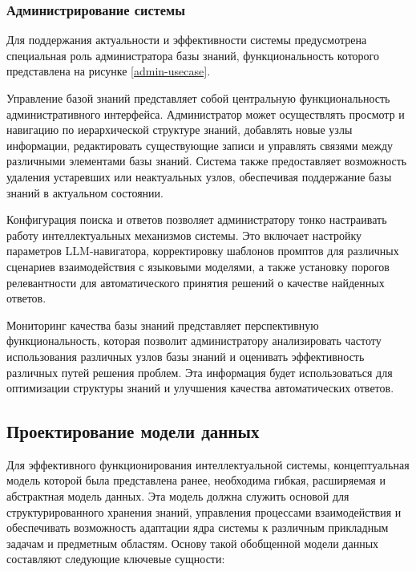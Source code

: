 \subsubsection{Администрирование системы}

Для поддержания актуальности и эффективности системы предусмотрена специальная роль администратора базы знаний, функциональность которого представлена на рисунке \ref{admin-usecase}.


Управление базой знаний представляет собой центральную функциональность административного интерфейса. Администратор может осуществлять просмотр и навигацию по иерархической структуре знаний, добавлять новые узлы информации, редактировать существующие записи и управлять связями между различными элементами базы знаний. Система также предоставляет возможность удаления устаревших или неактуальных узлов, обеспечивая поддержание базы знаний в актуальном состоянии.

Конфигурация поиска и ответов позволяет администратору тонко настраивать работу интеллектуальных механизмов системы. Это включает настройку параметров LLM-навигатора, корректировку шаблонов промптов для различных сценариев взаимодействия с языковыми моделями, а также установку порогов релевантности для автоматического принятия решений о качестве найденных ответов.

Мониторинг качества базы знаний представляет перспективную функциональность, которая позволит администратору анализировать частоту использования различных узлов базы знаний и оценивать эффективность различных путей решения проблем. Эта информация будет использоваться для оптимизации структуры знаний и улучшения качества автоматических ответов.



\subsection{Проектирование модели данных}

Для эффективного функционирования интеллектуальной системы, концептуальная модель которой была представлена ранее, необходима гибкая, расширяемая и абстрактная модель данных. Эта модель должна служить основой для структурированного хранения знаний, управления процессами взаимодействия и обеспечивать возможность адаптации ядра системы к различным прикладным задачам и предметным областям. Основу такой обобщенной модели данных составляют следующие ключевые сущности:


